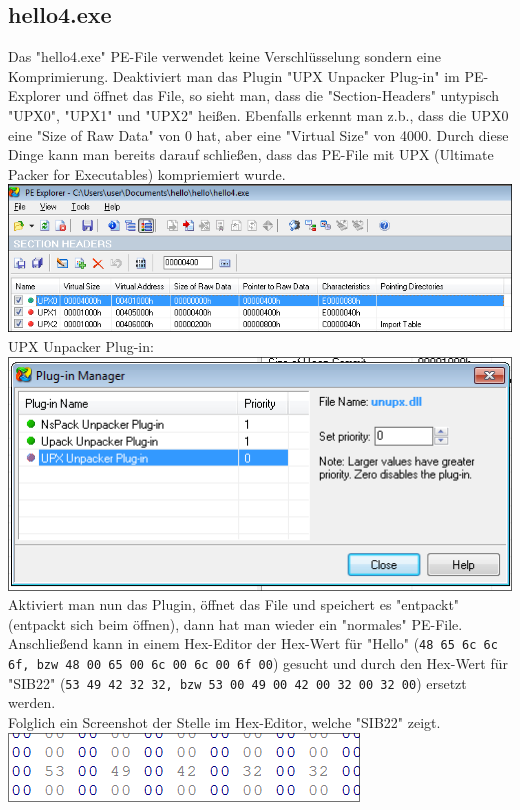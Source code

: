 \documentclass{article}
\begin{document}
	\subsection{hello4.exe}
	Das "hello4.exe" PE-File verwendet keine Verschlüsselung sondern eine Komprimierung. Deaktiviert man das Plugin "UPX Unpacker Plug-in" im PE-Explorer und öffnet das File, so sieht man, dass die "Section-Headers" untypisch "UPX0", "UPX1" und "UPX2" heißen. Ebenfalls erkennt man z.b., dass die UPX0 eine "Size of Raw Data" von 0 hat, aber eine "Virtual Size" von 4000. Durch diese Dinge kann man bereits darauf schließen, dass das PE-File mit UPX (Ultimate Packer for Executables) kompriemiert wurde.\\
	\includegraphics[width=0.5\linewidth]{pictures/UPX-section headers (no plugin)}\\
	UPX Unpacker Plug-in:\\
	\includegraphics[width=0.5\linewidth]{pictures/hello4-upx-plugin pe-explorer}\\
	Aktiviert man nun das Plugin, öffnet das File und speichert es "entpackt" (entpackt sich beim öffnen), dann hat man wieder ein "normales" PE-File. Anschließend kann in einem Hex-Editor der Hex-Wert für "Hello" (\texttt{48 65 6c 6c 6f, bzw 48 00 65 00 6c 00 6c 00 6f 00}) gesucht und durch den Hex-Wert für "SIB22" (\texttt{53 49 42 32 32, bzw 53 00 49 00 42 00 32 00 32 00}) ersetzt werden.\\
	Folglich ein Screenshot der Stelle im Hex-Editor, welche "SIB22" zeigt.\\
	\includegraphics[width=0.5\linewidth]{pictures/hello4-after unpacking edit in hex-explorer}\\
	
	\pagebreak
	
\end{document}
